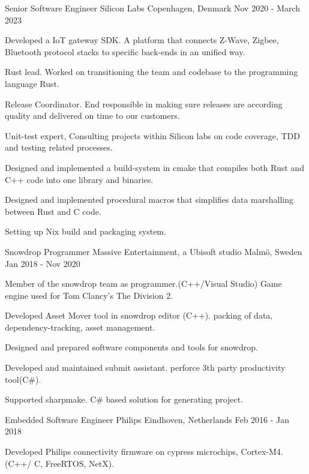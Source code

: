 \begin{cventries}
  \cventry
    {Senior Software Engineer}
    {Silicon Labs}
    {Copenhagen, Denmark}
    {Nov 2020 - March 2023}
    {
      \begin{cvitems}
		\item {Developed a IoT gateway SDK. A platform that connects Z-Wave, Zigbee, Bluetooth protocol stacks to specific back-ends in an unified way.}
		\item {Rust lead. Worked on transitioning the team and codebase to the programming language Rust.}
		\item {Release Coordinator. End responsible in making sure releases are according quality and delivered on time to our customers.}
		\item {Unit-test expert, Consulting projects within Silicon labs on code coverage, TDD and testing related processes.}
		\item {Designed and implemented a build-system in cmake that compiles both Rust and C++ code into one library and binaries.}
		\item {Designed and implemented procedural macros that simplifies data marshalling between Rust and C code.}
		\item {Setting up Nix build and packaging system.}
      \end{cvitems}
    }
  \cventry
    {Snowdrop Programmer}
    {Massive Entertainment, a Ubisoft studio}
    {Malmö, Sweden}
    {Jan 2018 - Nov 2020}
    {
      \begin{cvitems}
		\item { Member of the snowdrop team as programmer.(C++/Visual Studio) Game engine used for Tom Clancy's The Division 2. }
        \item { Developed Asset Mover tool in snowdrop editor (C++). packing of data, dependency-tracking, asset management.}
		\item { Designed and prepared software components and tools for snowdrop. }
        \item { Developed and maintained submit assistant. perforce 3th party productivity tool(C\#). }
        \item { Supported sharpmake. C\# based solution for generating project. }
      \end{cvitems}
    }
  \cventry
    {Embedded Software Engineer}
    {Philips}
    {Eindhoven, Netherlands}
    {Feb 2016 - Jan 2018}
    {
      \begin{cvitems}
        \item {Developed Philips connectivity firmware on cypress microchips, Cortex-M4.(C++/ C, FreeRTOS, NetX).}

\end{cvitems}}
\end{cventries}
